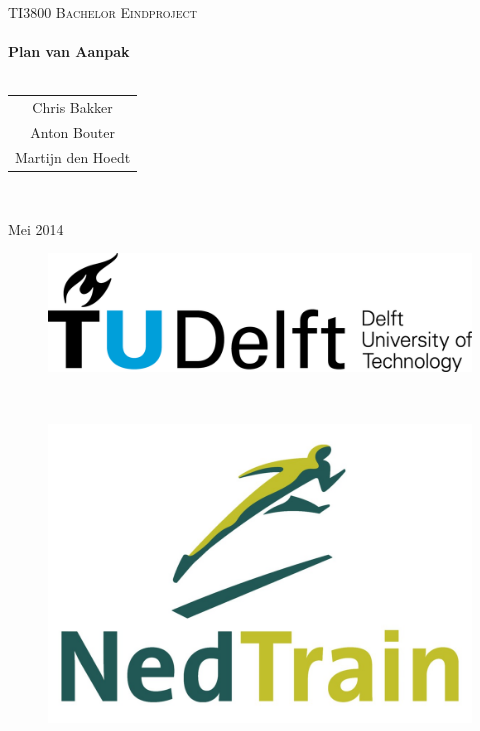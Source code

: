 

\pagestyle{fancy}
\begin{titlepage}
\center
\textsc{\huge TI3800 Bachelor Eindproject}\\[1.5cm]
\HRule \\[0.4cm]
{\Huge \bfseries Plan van Aanpak}\\[0.4cm]
\HRule \\[1.5cm]
\begin{Large}
\begin{tabular}{c}
Chris Bakker \\ 
Anton Bouter \\ 
Martijn den Hoedt\\
\end{tabular}\\[2cm]
\end{Large}

{\large Mei 2014}\\[1cm]

\begin{figure}[b]
\centering
\begin{minipage}{0.4\textwidth}
\begin{flushleft}
\includegraphics[width=0.9\linewidth]{../images/TU_Delft_logo.png}
\end{flushleft}
\end{minipage}
~
\begin{minipage}{0.4\textwidth}
\begin{flushright}
\includegraphics[width=0.9\linewidth]{../images/NedTrain_logo.png}
\end{flushright}
\end{minipage}\\[2cm]
\end{figure}

\vfill

\end{titlepage}

